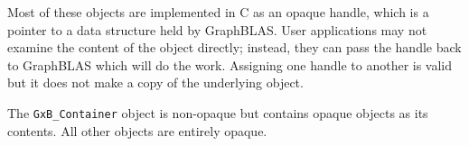 Most of these objects are implemented in C as an opaque handle, which is a
pointer to a data structure held by GraphBLAS.  User applications may not
examine the content of the object directly; instead, they can pass the handle
back to GraphBLAS which will do the work.  Assigning one handle to another
is valid but it does not make a copy of the underlying object.

The \verb'GxB_Container' object is non-opaque but contains opaque objects
as its contents.  All other objects are entirely opaque.




















